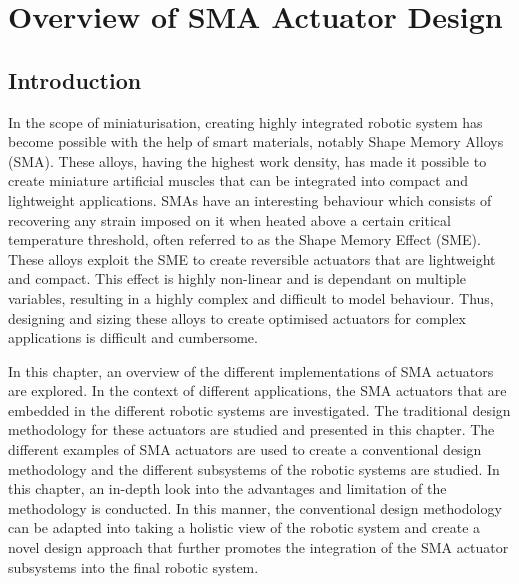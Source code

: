 \chapter{Overview of SMA Actuator Design}\label{chap:sma-actuator-design}
\section{Introduction}
In the scope of miniaturisation, creating highly integrated robotic system has become possible with the help of smart materials, notably Shape Memory Alloys (SMA). These alloys, having the highest work density, has made it possible to create miniature artificial muscles that can be integrated into compact and lightweight applications. SMAs have an interesting behaviour which consists of recovering any strain imposed on it when heated above a certain critical temperature threshold, often referred to as the Shape Memory Effect (SME). These alloys exploit the SME to create reversible actuators that are lightweight and compact. This effect is highly non-linear and is dependant on multiple variables, resulting in a highly complex and difficult to model behaviour. Thus, designing and sizing these alloys to create optimised actuators for complex applications is difficult and cumbersome.

In this chapter, an overview of the different implementations of SMA actuators are explored. In the context of different applications, the SMA actuators that are embedded in the different robotic systems are investigated. The traditional design methodology for these actuators are studied and presented in this chapter. The different examples of SMA actuators are used to create a conventional design methodology and the different subsystems of the robotic systems are studied. In this chapter, an in-depth look into the advantages and limitation of the methodology is conducted. In this manner, the conventional design methodology can be adapted into taking a holistic view of the robotic system and create a novel design approach that further promotes the integration of the SMA actuator subsystems into the final robotic system.

